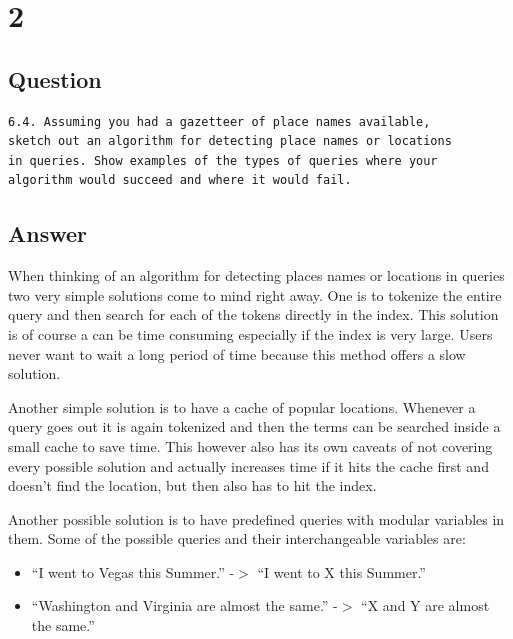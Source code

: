 \documentclass[letterpaper,11pt]{article}
\newcommand*{\srcPath}{../src}%
\begin{document}
 

\clearpage


\section*{2}

\subsection*{Question}

\begin{verbatim}
6.4. Assuming you had a gazetteer of place names available, 
sketch out an algorithm for detecting place names or locations
in queries. Show examples of the types of queries where your 
algorithm would succeed and where it would fail.
\end{verbatim}

\subsection*{Answer}

When thinking of an algorithm for detecting places names or locations in queries two very simple solutions come to mind right away.
One is to tokenize the entire query and then search for each of the tokens directly in the index.
This solution is of course a can be time consuming especially if the index is very large.
Users never want to wait a long period of time because this method offers a slow solution.

Another simple solution is to have a cache of popular locations.
Whenever a query goes out it is again tokenized and then the terms can be searched inside a small cache to save time.
This however also has its own caveats of not covering every possible solution and actually increases time if it hits the cache first and doesn't find the location, but then also has to hit the index.

Another possible solution is to have predefined queries with modular variables in them.
Some of the possible queries and their interchangeable variables are:

\begin{itemize}
  \item ``I went to Vegas this Summer.'' -$>$ ``I went to X this Summer.''
  \item ``Washington and Virginia are almost the same.'' -$>$ ``X and Y are almost the same.''
\end{itemize}
\end{document}
